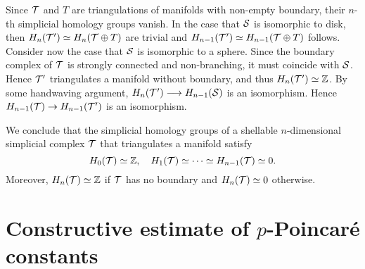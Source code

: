 \documentclass[a4paper]{amsart}
\begin{document}
\begin{remark}
    Since ${\mathcal T}$ and $T$ are triangulations of manifolds with non-empty boundary, their $n$-th simplicial homology groups vanish. 
    In the case that ${\mathcal S}$ is isomorphic to disk,
    then $H_{n}({\mathcal T}') \simeq H_{n}({\mathcal T} \oplus T)$ are trivial and $H_{n-1}({\mathcal T}') \simeq H_{n-1}({\mathcal T} \oplus T)$ follows.
    Consider now the case that ${\mathcal S}$ is isomorphic to a sphere.
    Since the boundary complex of ${\mathcal T}$ is strongly connected and non-branching, it must coincide with ${\mathcal S}$. Hence ${\mathcal T}'$ triangulates a manifold without boundary, and thus $H_{n}({\mathcal T}') \simeq {\mathbb Z}$. 
    \color{red}By some handwaving argument, $H_{n}({\mathcal T}') \longrightarrow H_{n-1}({\mathcal S})$ is an isomorphism.\color{black}
    Hence $H_{n-1}({\mathcal T}) \rightarrow H_{n-1}({\mathcal T}')$ is an isomorphism.
    
    We conclude that the simplicial homology groups of a shellable $n$-dimensional simplicial complex ${\mathcal T}$ that triangulates a manifold satisfy 
    \[
        H_0({\mathcal T}) \simeq {\mathbb Z}, 
        \quad 
        H_1({\mathcal T}) \simeq \dots \simeq H_{n-1}({\mathcal T}) \simeq 0.
    \]
    Moreover, $H_n({\mathcal T}) \simeq {\mathbb Z}$ if ${\mathcal T}$ has no boundary and $H_n({\mathcal T}) \simeq 0$ otherwise. 
    
\end{remark}



\section{Constructive estimate of $p$-Poincar\'e constants}
\end{document}
